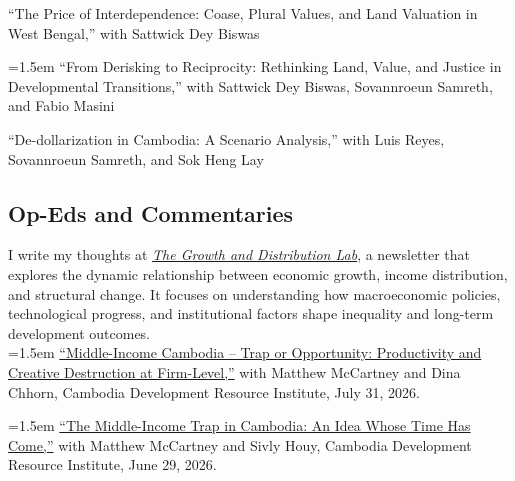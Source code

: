 \documentclass[10pt,a4paper]{article}
\begin{document}
	``The Price of Interdependence:	Coase, Plural Values, and Land Valuation in West Bengal,'' with Sattwick Dey Biswas \\ \vspace{-.5em}
	
	\hangindent=1.5em
	``From Derisking to Reciprocity: Rethinking Land, Value, and Justice in Developmental Transitions,'' with Sattwick Dey Biswas, Sovannroeun Samreth, and Fabio Masini  \\ \vspace{-.5em}
	
	``De-dollarization in Cambodia: A Scenario Analysis,'' with Luis Reyes, Sovannroeun Samreth, and Sok Heng Lay  \\ \vspace{-.5em}
	


\subsection*{Op-Eds and Commentaries}

	I write my thoughts at \textit{\href{https://kosalnith.substack.com/}{The Growth and Distribution Lab}}, a newsletter that explores the dynamic relationship between economic growth, income distribution, and structural change. It focuses on understanding how macroeconomic policies, technological progress, and institutional factors shape inequality and long-term development outcomes. \\
	
	
	\hangindent=1.5em
	\href{https://www.cdri.org.kh/news/middle-income-cambodia-trap-or-opportunity-productivity-and-creative-destruction-at-firm-level-part-ii-2}{``Middle-Income Cambodia – Trap or Opportunity: Productivity and Creative Destruction at Firm-Level,''} with Matthew McCartney and Dina Chhorn, Cambodia Development Resource Institute, July 31, 2026.\\ \vspace{-.5em}
	
	\hangindent=1.5em
	\href{https://www.cdri.org.kh/news/the-middle-income-trap-in-cambodia-an-idea-whose-time-has-come}{``The Middle-Income Trap in Cambodia: An Idea Whose Time Has Come,''} with Matthew McCartney and Sivly Houy, Cambodia Development Resource Institute, June 29, 2026.\\ \vspace{-.5em}
	
\end{document}
